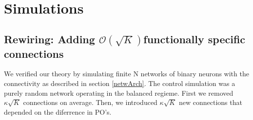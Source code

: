 \section{Simulations}

\subsection{Rewiring: Adding $\mathcal{O} (\sqrt{K})$functionally specific connections}
We verified our theory by simulating finite N networks of binary neurons with the connectivity as described in section \ref{netwArch}. 
The control simulation was a purely random network operating in the balanced regieme. First we removed $\kappa \sqrt{K}$ connections on average. Then, we introduced $\kappa \sqrt{K}$ new connections that depended on the diferrence in PO's. 


